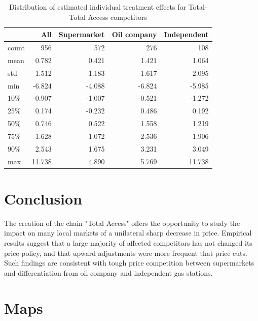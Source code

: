 \documentclass[11pt]{article}
\begin{document}
\begin{table}[h]
\centering
\caption{Distribution of estimated individual treatment effects for Total-Total Access competitors}
\begin{tabular}{lrrrr}
\toprule
{} &     All &    Supermarket &    Oil company &     Independent \\
\midrule
count & 956 & 572 & 276 & 108 \\
mean  &   0.782 &   0.421 &   1.421 &   1.064 \\
std   &   1.512 &   1.183 &   1.617 &   2.095 \\
min   &  -6.824 &  -4.088 &  -6.824 &  -5.985 \\
10\%   &  -0.907 &  -1.007 &  -0.521 &  -1.272 \\
25\%   &   0.174 &  -0.232 &   0.486 &   0.192 \\
50\%   &   0.746 &   0.522 &   1.558 &   1.219 \\
75\%   &   1.628 &   1.072 &   2.536 &   1.906 \\
90\%   &   2.543 &   1.675 &   3.231 &   3.049 \\
max   &  11.738 &   4.890 &   5.769 &  11.738 \\
\bottomrule
\end{tabular}
\label{table:ta_fe_indiv_tta}
\end{table}

\clearpage

\section{Conclusion}

The creation of the chain "Total Access" offers the opportunity to study the impact on many local markets of a unilateral sharp decrease in price. Empirical results suggest that a large majority of affected competitors has not changed its price policy, and that upward adjustments were more frequent that price cuts. Such findings are consistent with tough price competition between supermarkets and differentiation from oil company and independent gas stations.

\clearpage



\newpage

\appendix

\section{Maps}
\end{document}
